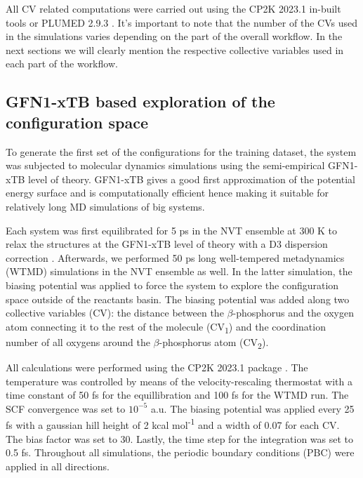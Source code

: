 All CV related computations were carried out using the CP2K 2023.1 in-built tools \citep{kuhne_cp2k_2020} or PLUMED 2.9.3 \citep{tribello_plumed_2014}. It's important to note that the number of the CVs used in the simulations varies depending on the part of the overall workflow. In the next sections we will clearly mention the respective collective variables used in each part of the workflow.



\subsection{GFN1-xTB based exploration of the configuration space}
To generate the first set of the configurations for the training dataset, the system was subjected to molecular dynamics simulations using the semi-empirical GFN1-xTB \citep{grimme_robust_2017} level of theory. GFN1-xTB gives a good first approximation of the potential energy surface and is computationally efficient hence making it suitable for relatively long MD simulations of big systems. 

Each system was first equilibrated for 5 ps in the NVT ensemble at 300 K to relax the structures at the GFN1-xTB level of theory with a D3 dispersion correction \citep{grimme_consistent_2010}. Afterwards, we performed 50 ps long well-tempered metadynamics (WTMD) simulations in the NVT ensemble as well. In the latter simulation, the biasing potential was applied to force the system to explore the configuration space outside of the reactants basin. The biasing potential was added along two collective variables (CV): the distance between the $\beta$-phosphorus and the oxygen atom connecting it to the rest of the molecule (CV\textsubscript{1}) and the coordination number of all oxygens around the $\beta$-phosphorus atom (CV\textsubscript{2}). 

All calculations were performed using the CP2K 2023.1 package \citep{kuhne_cp2k_2020}. The temperature was controlled by means of the velocity-rescaling thermostat \citep{bussi_canonical_2007} with a time constant of 50 fs for the equillibration and 100 fs for the WTMD run. The SCF convergence was set to $10^{-5}$ a.u. The biasing potential was applied every 25 fs with a gaussian hill height of 2 kcal mol\textsuperscript{-1} and a width of 0.07 for each CV. The bias factor was set to 30. Lastly, the time step for the integration was set to 0.5 fs. Throughout all simulations, the periodic boundary conditions (PBC) were applied in all directions.



